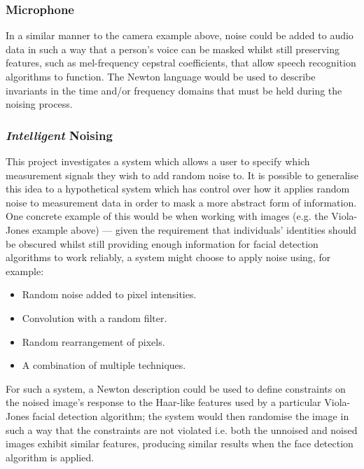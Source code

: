 \documentclass[12pt]{article}
\begin{document}
    \subsubsection{Microphone}
      In a similar manner to the camera example above, noise could be added to audio data in such a way that a person's voice can be masked whilst still preserving features, such as mel-frequency cepstral coefficients, that allow speech recognition algorithms to function. The Newton language would be used to describe invariants in the time and/or frequency domains that must be held during the noising process.

    \subsubsection{\textit{Intelligent} Noising}
      This project investigates a system which allows a user to specify which measurement signals they wish to add random noise to. It is possible to generalise this idea to a hypothetical system which has control over how it applies random noise to measurement data in order to mask a more abstract form of information. One concrete example of this would be when working with images (e.g. the  Viola-Jones example above) --- given the requirement that individuals' identities should be obscured whilst still providing enough information for facial detection algorithms to work reliably, a system might choose to apply noise using, for example:

      \begin{itemize}
        \item Random noise added to pixel intensities.
        \item Convolution with a random filter.
        \item Random rearrangement of pixels.
        \item A combination of multiple techniques.
      \end{itemize}

      For such a system, a Newton description could be used to define constraints on the noised image's response to the Haar-like features used by a particular Viola-Jones facial detection algorithm; the system would then randomise the image in such a way that the constraints are not violated i.e. both the unnoised and noised images exhibit similar features, producing similar results when the face detection algorithm is applied.
\end{document}
